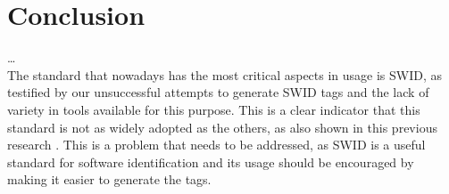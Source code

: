 \section{Conclusion}
\dots
\\ The standard that nowadays has the most critical aspects in usage is SWID, as testified by our unsuccessful attempts to generate SWID tags and the lack of variety in tools available for this purpose. This is a clear indicator that this standard is not as widely adopted as the others, as also shown in this previous research \cite{article:software-bom}. This is a problem that needs to be addressed, as SWID is a useful standard for software identification and its usage should be encouraged by making it easier to generate the tags.  